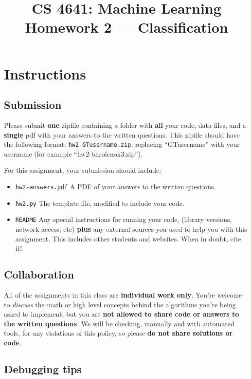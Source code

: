 \documentclass{article}
\title{CS 4641: Machine Learning\\
Homework 2 --- Classification}
\date{}
\author{}
\begin{document}
\maketitle

\newcommand{\bphnote}[1]{\textit{\textcolor{red}{#1}}}


\section*{Instructions} 
\subsection*{Submission}
Please submit \textbf{one} zipfile containing a folder with \textbf{all} your code, data files, and a 
\textbf{single} pdf with your answers to the written questions. This zipfile should have the following format: 
\texttt{hw2-GTusername.zip}, replacing ``GTusername'' with your username (for example ``hw2-bhrolenok3.zip'').

For this assignment, your submission should include:
\begin{itemize}
	\item \texttt{hw2-answers.pdf} A PDF of your answers to the written questions.
	\item \texttt{hw2.py} The template file, modified to include your code.
	\item \texttt{README} Any special instructions for running your code, (library versions, network access, etc) 
	\textbf{plus} any external sources you used to help you with this assignment. This includes other students and websites. 
	When in doubt, cite it!
\end{itemize}

\subsection*{Collaboration}
All of the assignments in this class are \textbf{individual work only}. You're welcome to \emph{discuss} the math or high 
level concepts behind the algorithms you're being asked to implement, but you are 
\textbf{not allowed to share code or answers to the written questions}. We will be checking, manually and with automated 
tools, for any violations of this policy, so please \textbf{do not share solutions or code}.

\subsection*{Debugging tips}
\end{document}
